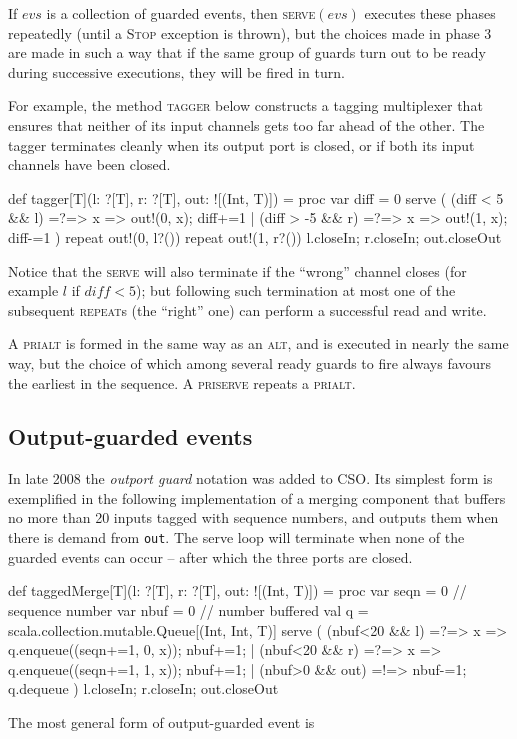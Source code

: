 \documentclass[12pt]{IOS-Book-Article-CPA-2017}
\begin{document}
If $evs$ is a collection of guarded events, then \textsc{serve}$(evs)$  executes these
phases repeatedly (until a \textsc{Stop} exception is thrown), but the choices made in phase 3 are made in such
a way that if the same group of guards turn out to be ready during
successive executions, they will be fired in turn.

For example, the method \textsc{tagger} below constructs a tagging
multiplexer that ensures that neither of its input channels
gets too far ahead of the other. The tagger terminates
cleanly when its output port is closed, or if both its
input channels have been closed. 
\begin{code+}[...]{}
  def tagger[T](l: ?[T], r: ?[T], out: ![(Int, T)]) = 
  proc
  { var diff = 0
    serve ( (diff < 5  && l) =?=> { x => out!(0, x); diff+=1 }
          | (diff > -5 && r) =?=> { x => out!(1, x); diff-=1 }
          ) 
    repeat { out!(0, l?()) } 
    repeat { out!(1, r?()) } 
    l.closeIn; r.closeIn; out.closeOut 
  }
\end{code+}
Notice that the  \textsc{serve} will also terminate if the ``wrong'' channel closes (for
example $l$ if $diff<5$); but following such termination at most one of the subsequent  
\textsc{repeat}s
(the ``right'' one) can perform a successful read and write.


A \textsc{prialt} is formed in the same way as an \textsc{alt},
and is executed in nearly the same way, but the choice of which among
several ready guards to fire always favours the earliest in the sequence.
A \textsc{priserve} repeats a \textsc{prialt}.

\subsection{Output-guarded events}
In late 2008 the \textit{outport guard} notation was added to CSO. Its simplest
form is exemplified in the following implementation of a merging component 
that buffers no more than 20 inputs tagged with sequence numbers, and 
outputs them when there is demand from \verb/out/. The serve loop 
will terminate when none of the guarded events can occur -- after which 
the three ports are closed.
\begin{code+}[...]{}
  def taggedMerge[T](l: ?[T], r: ?[T], out: ![(Int, T)]) = 
  proc
  { var seqn = 0 // sequence number
    var nbuf = 0 // number buffered 
    val q        = scala.collection.mutable.Queue[(Int, Int, T)]
    serve ( (nbuf<20 && l)   =?=> { x => q.enqueue((seqn+=1, 0, x)); nbuf+=1; }
          | (nbuf<20 && r)   =?=> { x => q.enqueue((seqn+=1, 1, x)); nbuf+=1; }
          | (nbuf>0  && out) =!=> { nbuf-=1; q.dequeue } 
          ) 
    l.closeIn; r.closeIn; out.closeOut  
  }
\end{code+}
The most general form of output-guarded event is
\end{document}
